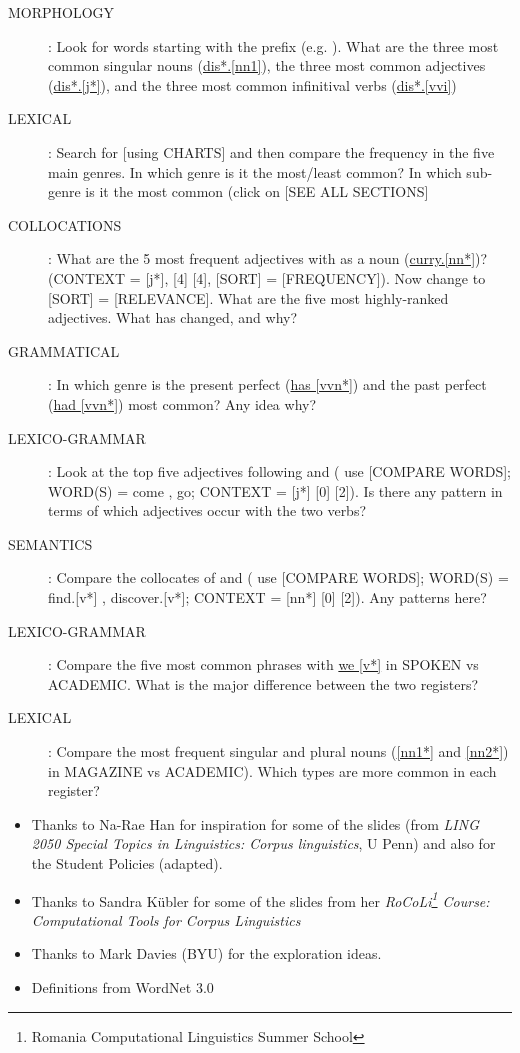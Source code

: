 \documentclass[a4paper,landscape,headrule,footrule]{foils}
\begin{document}
\begin{description}
\item [MORPHOLOGY]: Look for words starting with the prefix 
  (e.g. ).  What are the three most common singular nouns
  (\url{dis*.[nn1]}), the three most common adjectives (\url{dis*.[j*]}), and the
  three most common infinitival verbs (\url{dis*.[vvi]})

\item [LEXICAL]: Search for  [using CHARTS] and then
  compare the frequency in the five main genres.  In which genre is it
  the most/least common? In which sub-genre is it the most common
  (click on [SEE ALL SECTIONS]
\newpage

 \item [COLLOCATIONS]: What are the 5 most frequent adjectives with
    as a noun (\url{curry.[nn*]})? (CONTEXT = [j*], [4] [4], [SORT] =
   [FREQUENCY]). Now change to [SORT] = [RELEVANCE]. What are the five
   most highly-ranked adjectives. What has changed, and why?

\item[GRAMMATICAL]: In which genre is the present perfect (\url{has [vvn*]}) and the past perfect (\url{had [vvn*]}) most common? Any idea why?

\item[LEXICO-GRAMMAR]: Look at the top five adjectives following  and  ( use [COMPARE WORDS]; WORD(S) = come , go; CONTEXT =  [j*] [0] [2]). Is there any pattern in terms of which adjectives occur with the two verbs?
\newpage
\item[SEMANTICS]: Compare the collocates of  and
   ( use [COMPARE WORDS]; WORD(S) = find.[v*] ,
  discover.[v*]; CONTEXT = [nn*] [0] [2]). Any patterns here?

\item[LEXICO-GRAMMAR]: Compare the five most common phrases with
  \url{we [v*]} in SPOKEN vs ACADEMIC.  What is the major difference
  between the two registers?

\item[LEXICAL]: Compare the most frequent singular and plural nouns
  (\url{[nn1*]} and \url{[nn2*]}) in MAGAZINE vs ACADEMIC).  Which
  types are more common in each register?
\end{description}






\begin{itemize}
\item Thanks to Na-Rae Han for 
  inspiration for some of the slides (from  \textit{LING 2050 Special Topics in Linguistics: Corpus linguistics}, U Penn) and also for the Student Policies (adapted).
\item Thanks to Sandra K\"{u}bler for some of the slides from her 
\textit{RoCoLi\footnote{Romania Computational Linguistics Summer School} Course: Computational Tools for Corpus Linguistics}
\item Thanks to Mark Davies (BYU) for the exploration ideas.
\item Definitions from WordNet 3.0
\end{itemize}


\small


\end{document}
